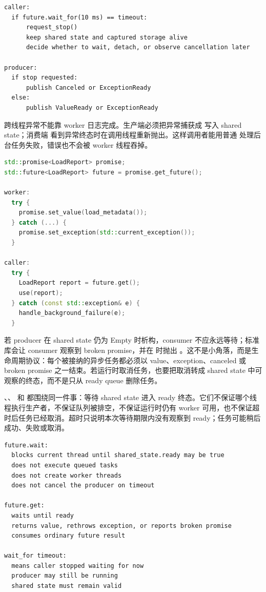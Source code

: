 \begin{lstlisting}[numbers=none,caption={timeout 不等于取消完成}]
caller:
  if future.wait_for(10 ms) == timeout:
      request_stop()
      keep shared state and captured storage alive
      decide whether to wait, detach, or observe cancellation later

producer:
  if stop requested:
      publish Canceled or ExceptionReady
  else:
      publish ValueReady or ExceptionReady
\end{lstlisting}

跨线程异常不能靠 worker 日志完成。生产端必须把异常捕获成  写入 shared state；消费端  看到异常终态时在调用线程重新抛出。这样调用者能用普通  处理后台任务失败，错误也不会被 worker 线程吞掉。

\begin{lstlisting}[language=C++,caption={异常必须进入 promise，而不是停在 worker 日志}]
std::promise<LoadReport> promise;
std::future<LoadReport> future = promise.get_future();

worker:
  try {
    promise.set_value(load_metadata());
  } catch (...) {
    promise.set_exception(std::current_exception());
  }

caller:
  try {
    LoadReport report = future.get();
    use(report);
  } catch (const std::exception& e) {
    handle_background_failure(e);
  }
\end{lstlisting}

若 producer 在 shared state 仍为 Empty 时析构，consumer 不应永远等待；标准库会让 consumer 观察到 broken promise，并在  时抛出 。这不是小角落，而是生命周期协议：每个被接纳的异步任务都必须以 value、exception、canceled 或 broken promise 之一结束。若运行时取消任务，也要把取消转成 shared state 中可观察的终态，而不是只从 ready queue 删除任务。

、、 和  都围绕同一件事：等待 shared state 进入 ready 终态。它们不保证哪个线程执行生产者，不保证队列被排空，不保证运行时仍有 worker 可用，也不保证超时后任务已经取消。超时只说明本次等待期限内没有观察到 ready；任务可能稍后成功、失败或取消。

\begin{lstlisting}[numbers=none,caption={future 等待不能被误读成调度保证}]
future.wait:
  blocks current thread until shared_state.ready may be true
  does not execute queued tasks
  does not create worker threads
  does not cancel the producer on timeout

future.get:
  waits until ready
  returns value, rethrows exception, or reports broken promise
  consumes ordinary future result

wait_for timeout:
  means caller stopped waiting for now
  producer may still be running
  shared state must remain valid
\end{lstlisting}

